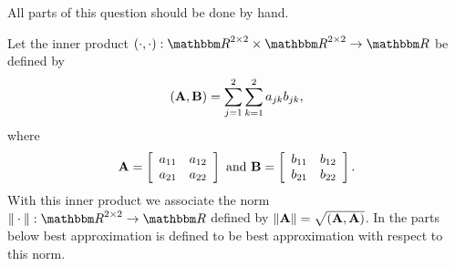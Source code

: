 
All parts of this question should be done by hand.

Let the inner product $\ip{\cdot,\cdot}:\R^{2\times 2}\times\R^{2\times 2}\to\R$ be defined by
      \[ ({\bf A},{\bf B}) = \sum_{j=1}^2 \sum_{k=1}^2 a_{jk} b_{jk},\]
       where
      \[ {\bf A} = \left[\begin{array}{cc}a_{11} & a_{12} \\ a_{21} & a_{22}\end{array}\right]
\mbox{ and }
         {\bf B} = \left[\begin{array}{cc}b_{11} & b_{12} \\ b_{21} & b_{22}\end{array}\right].\]
      With this inner product we associate the norm $\norm{\cdot}:\R^{2\times 2}\to\R$ defined by $\|{\bf A}\| = \sqrt{({\bf A},{\bf A})}$. In the parts below best approximation is defined to be best approximation with respect to this norm.
\\

